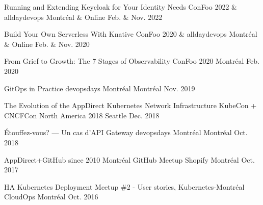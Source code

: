 \begin{cvhonors}

  \cvhonor
    {Running and Extending Keycloak for Your Identity Needs} %
    {ConFoo 2022 \& alldaydevops} %
    {} %
    {Montréal \& Online} %
    {Feb. \& Nov. 2022} %

  \cvhonor
    {Build Your Own Serverless With Knative} %
    {ConFoo 2020 \& alldaydevops} %
    {} %
    {Montréal \& Online} %
    {Feb. \& Nov. 2020} %

  \cvhonor
    {From Grief to Growth: The 7 Stages of Observability} %
    {ConFoo 2020} %
    {} %
    {Montréal} %
    {Feb. 2020} %

  \cvhonor
    {GitOps in Practice} %
    {devopsdays Montréal} %
    {} %
    {Montréal} %
    {Nov. 2019} %

  \cvhonor
    {The Evolution of the AppDirect Kubernetes Network Infrastructure} %
    {KubeCon + CNCFCon North America 2018} %
    {} %
    {Seattle} %
    {Dec. 2018} %

  \cvhonor
    {Étouffez-vous? — Un cas d’API Gateway} %
    {devopsdays Montréal} %
    {} %
    {Montréal} %
    {Oct. 2018} %

  \cvhonor
    {AppDirect+GitHub since 2010} %
    {Montréal GitHub Meetup} %
    {} %
    {Shopify Montréal} %
    {Oct. 2017} %

  \cvhonor
    {HA Kubernetes Deployment} %
    {Meetup \#2 - User stories, Kubernetes-Montréal} %
    {} %
    {CloudOps Montréal} %
    {Oct. 2016} %

\end{cvhonors}